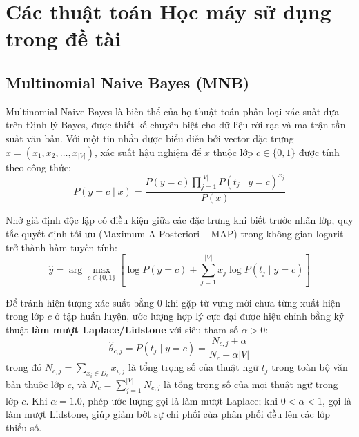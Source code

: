 \documentclass[12pt,a4paper]{report}
\begin{document}
\section{Các thuật toán Học máy sử dụng trong đề tài}
\subsection{Multinomial Naive Bayes (MNB)}
Multinomial Naive Bayes là biến thể của họ thuật toán phân loại xác suất dựa trên Định lý Bayes, được thiết kế chuyên biệt cho dữ liệu rời rạc và ma trận tần suất văn bản. Với một tin nhắn được biểu diễn bởi vector đặc trưng $x = (x_1, x_2, \dots, x_{|V|})$, xác suất hậu nghiệm để $x$ thuộc lớp $c \in \{0, 1\}$ được tính theo công thức:
\begin{equation}
    P(y = c \mid x) = \frac{P(y = c) \prod_{j=1}^{|V|} P(t_j \mid y = c)^{x_j}}{P(x)}
\end{equation}

Nhờ giả định độc lập có điều kiện giữa các đặc trưng khi biết trước nhãn lớp, quy tắc quyết định tối ưu (Maximum A Posteriori -- MAP) trong không gian logarit trở thành hàm tuyến tính:
\begin{equation}
    \hat{y} = \arg\max_{c \in \{0, 1\}} \left[ \log P(y = c) + \sum_{j=1}^{|V|} x_j \log P(t_j \mid y = c) \right]
\end{equation}

Để tránh hiện tượng xác suất bằng $0$ khi gặp từ vựng mới chưa từng xuất hiện trong lớp $c$ ở tập huấn luyện, ước lượng hợp lý cực đại được hiệu chỉnh bằng kỹ thuật \textbf{làm mượt Laplace/Lidstone} với siêu tham số $\alpha > 0$:
\begin{equation}
    \hat{\theta}_{c, j} = P(t_j \mid y = c) = \frac{N_{c, j} + \alpha}{N_c + \alpha |V|}
\end{equation}
trong đó $N_{c, j} = \sum_{x_i \in D_c} x_{i, j}$ là tổng trọng số của thuật ngữ $t_j$ trong toàn bộ văn bản thuộc lớp $c$, và $N_c = \sum_{j=1}^{|V|} N_{c, j}$ là tổng trọng số của mọi thuật ngữ trong lớp $c$. Khi $\alpha = 1.0$, phép ước lượng gọi là làm mượt Laplace; khi $0 < \alpha < 1$, gọi là làm mượt Lidstone, giúp giảm bớt sự chi phối của phân phối đều lên các lớp thiểu số.
\end{document}
